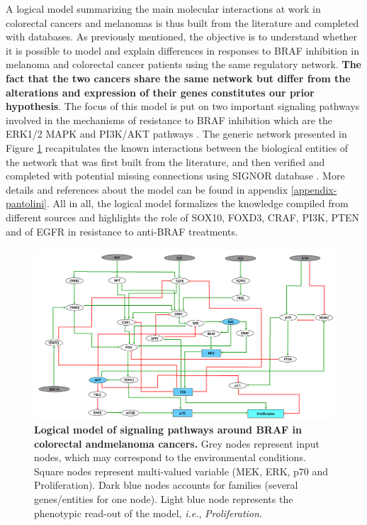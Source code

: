 \documentclass[a4paper,12pt,twoside,onecolumn,openright,final,oldfontcommands]{memoir}
\begin{document}
A logical model summarizing the main molecular interactions at work in
colorectal cancers and melanomas is thus built from the literature and
completed with databases. As previously mentioned, the objective is to
understand whether it is possible to model and explain differences in
responses to BRAF inhibition in melanoma and colorectal cancer patients
using the same regulatory network. \textbf{The fact that the two cancers
share the same network but differ from the alterations and expression of
their genes constitutes our prior hypothesis}. The focus of this model
is put on two important signaling pathways involved in the mechanisms of
resistance to BRAF inhibition which are the ERK1/2 MAPK and PI3K/AKT
pathways \citep{ursem2018emerging, rossi2019drug}. The generic network
presented in Figure \ref{fig:BRAF-model} recapitulates the known
interactions between the biological entities of the network that was
first built from the literature, and then verified and completed with
potential missing connections using SIGNOR database
\citep{perfetto2016signor}. More details and references about the model
can be found in appendix \ref{appendix-pantolini}. All in all, the
logical model formalizes the knowledge compiled from different sources
and highlights the role of SOX10, FOXD3, CRAF, PI3K, PTEN and of EGFR in
resistance to anti-BRAF treatments.

\begin{figure}

{\centering \includegraphics[width=0.9\linewidth]{fig/BRAF-model} 

}

\caption[Logical model of signaling pathways around BRAF in colorectal and melanoma cancers]{\textbf{Logical model of signaling pathways
around BRAF in colorectal andmelanoma cancers.} Grey nodes represent
input nodes, which may correspond to the environmental conditions.
Square nodes represent multi-valued variable (MEK, ERK, p70 and
Proliferation). Dark blue nodes accounts for families (several
genes/entities for one node). Light blue node represents the phenotypic
read-out of the model, \emph{i.e.}, \emph{Proliferation}.}\label{fig:BRAF-model}
\end{figure}
\end{document}
